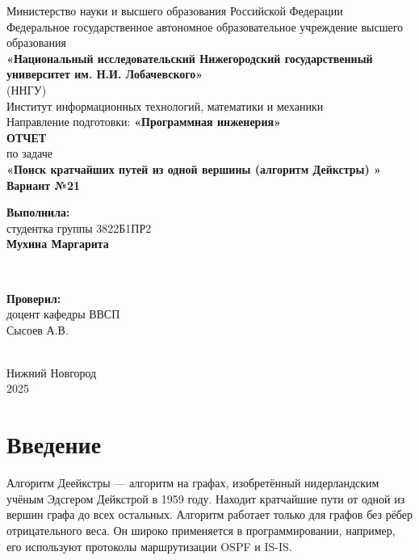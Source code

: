 \documentclass[12pt]{article}
\begin{document}
\begin{titlepage}
    \centering
    \large
    Министерство науки и высшего образования Российской Федерации\\[0.5cm]
    Федеральное государственное автономное образовательное учреждение высшего образования\\[0.5cm]
    \textbf{«Национальный исследовательский Нижегородский государственный университет им. Н.И. Лобачевского»}\\
    (ННГУ)\\[1cm]
    Институт информационных технологий, математики и механики\\[0.5cm]
    Направление подготовки: \textbf{«Программная инженерия»}\\[2cm]

    \vfill
    {\LARGE \textbf{ОТЧЕТ}}\\[0.5cm]
    {\Large по задаче}\\[0.5cm]
    {\LARGE \textbf{«Поиск кратчайших путей из одной вершины (алгоритм Дейкстры) »}}\\[0.5cm]
    {\Large \textbf{Вариант №21}}\\[2.5cm]

    \hfill\parbox{0.5\textwidth}{
        \textbf{Выполнила:} \\
        студентка группы 3822Б1ПР2 \\
        \textbf{Мухина Маргарита}
    }\\[0.5cm]

    \hfill\parbox{0.5\textwidth}{
        \textbf{Проверил:} \\
        доцент кафедры ВВСП \\
        Сысоев А.В.

    }\\[2cm]

    Нижний Новгород\\
    2025
\end{titlepage}


\thispagestyle{empty}
\clearpage
{} 
\setcounter{page}{2} 
\tableofcontents
\clearpage
\setcounter{page}{3} 
\section{Введение}

\hspace*{1.25em}Алгоритм Деейкстры — алгоритм на графах, изобретённый нидерландским учёным Эдсгером Дейкстрой в 1959 году. Находит кратчайшие пути от одной из вершин графа до всех остальных. Алгоритм работает только для графов без рёбер отрицательного веса. Он широко применяется в программировании, например, его используют протоколы маршрутизации OSPF и IS-IS.
\end{document}
